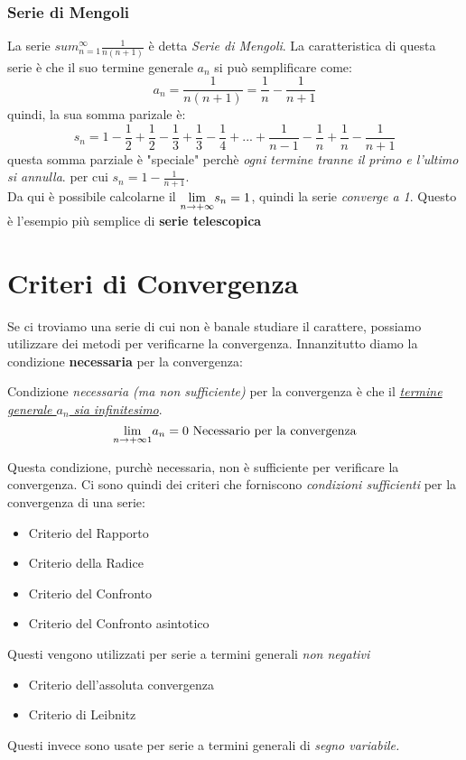 \documentclass[12pt, a4paper, openany]{book}
\newcommand{\definizione}[1]{\begin{box_definizione} #1 \end{box_definizione}}
\begin{document}
\subsubsection*{Serie di Mengoli}
La serie $sum_{n=1}^\infty \frac{1}{n(n+1)}$ è detta \emph{Serie di Mengoli}.
La caratteristica di questa serie è che il suo termine generale $a_n$ si può semplificare come:
\begin{equation*}
    a_n = \frac{1}{n(n+1)} = \frac{1}{n} - \frac{1}{n+1}
\end{equation*}
quindi, la sua somma parizale è:
\begin{equation*}
    s_n = 1 - \frac{1}{2} + \frac{1}{2} - \frac{1}{3} +  \frac{1}{3} - \frac{1}{4} + ... +  \frac{1}{n-1} - \frac{1}{n} +  \frac{1}{n} - \frac{1}{n+1}
\end{equation*}
questa somma parziale è "speciale" perchè \emph{ogni termine tranne il primo e l'ultimo si annulla}. per cui $s_n = 1 - \frac{1}{n+1}$.
\\Da qui è possibile calcolarne il $\underset{n \to +\infty}{\lim} s_n = 1$, quindi la serie \emph{converge a 1}.
Questo è l'esempio più semplice di \textbf{serie telescopica}  

\section{Criteri di Convergenza}
Se ci troviamo una serie di cui non è banale studiare il carattere, possiamo utilizzare dei metodi per verificarne la convergenza.
Innanzitutto diamo la condizione \textbf{necessaria} per la convergenza:
\definizione{
    Condizione \emph{necessaria (ma non sufficiente)} per la convergenza è che il \underline{\emph{termine generale $a_n$ sia infinitesimo}}.
    \begin{equation*}
        \underset{n \to +\infty1}{\lim} a_n = 0 \text{ Necessario per la convergenza}
    \end{equation*}
    }
Questa condizione, purchè necessaria, non è sufficiente per verificare la convergenza.
Ci sono quindi dei criteri che forniscono \emph{condizioni sufficienti} per la convergenza di una serie:

\begin{itemize}
    \item Criterio del Rapporto
    \item Criterio della Radice
    \item Criterio del Confronto
    \item Criterio del Confronto asintotico
\end{itemize}
Questi vengono utilizzati per serie a termini generali \emph{non negativi}
\begin{itemize}
    \item Criterio dell'assoluta convergenza
    \item Criterio di Leibnitz
\end{itemize}
Questi invece sono usate per serie a termini generali di \emph{segno variabile.}
\end{document}
